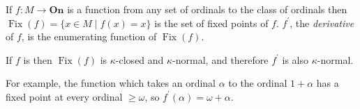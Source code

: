 \documentclass[12pt]{article}
\begin{document}
If $f\colon M\rightarrow\mathbf{On}$ is a function from any set of ordinals to the class of ordinals then $\operatorname{Fix}(f)=\{x\in M\mid f(x)=x\}$ is the set of fixed points of $f$.  $f^\prime$, the \emph{derivative} of $f$, is the enumerating function of $\operatorname{Fix}(f)$.

If $f$ is  then $\operatorname{Fix}(f)$ is $\kappa$-closed and $\kappa$-normal, and therefore $f^\prime$ is also $\kappa$-normal.

For example, the function which takes an ordinal $\alpha$ to the ordinal $1+\alpha$ has a fixed point at every ordinal $\geq\omega$, so $f^\prime(\alpha)=\omega+\alpha$.
\end{document}
